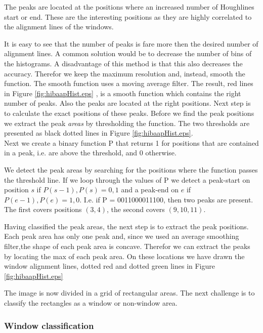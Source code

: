 The peaks are located at the positions where an increased number of Houghlines
start or end.  These are the interesting positions as they are highly correlated
to the alignment lines of the windows. 

It is easy to see that the number of peaks is fare more then the desired number of alignment lines.
A common solution would be to decrease the number of bins of the histograms. A
disadvantage of this method is that this also decreases the accuracy. Therefor
we keep the maximum resolution and, instead, smooth the function. The smooth
function uses a moving average filter.
The result, red lines in Figure \ref{fig:hibaapHist.eps}
, is a smooth function which contains the right number of peaks. Also the peaks
are located at the right positions. Next step is to calculate the exact positions of these peaks.
Before we find the peak positions we extract the peak \emph{areas} by thresholding the
function. The two thresholds are presented as black dotted lines in Figure \ref{fig:hibaapHist.eps}.\\
Next we create a binary function P that returns 1 for positions that are contained in
a peak, i.e. are above the threshold, and 0 otherwise.

We detect the peak areas by searching for the positions where the function
passes the threshold line. 
If we loop through the values of P we detect a peak-start on position $s$ if ${P(s-1),P(s)}={0,1}$
and a peak-end on $e$ if ${P(e-1),P(e)}={1,0}$. 
I.e. if P = 0011000011100, then two peaks are present. The first covers positions $(3,4)$, 
the second covers $(9,10,11)$. 

Having classified the peak areas, the next step is to extract the peak positions. 
Each peak area has only one peak and, since we used an average smoothing filter,the shape of each  
peak area is concave. Therefor we can extract the peaks
by locating the max of each peak area. 
On these locations we have drawn the window alignment lines, dotted red and dotted green lines
in Figure \ref{fig:hibaapHist.eps}

The image is now divided in a grid of rectangular areas. The next challenge is to 
classify the rectangles as a window or non-window area.

\subsubsection{Window classification}
